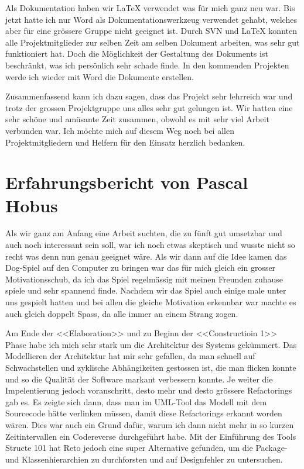 \documentclass[12pt,halfparskip]{scrartcl}
\begin{document}
Als Dokumentation haben wir LaTeX verwendet was für mich ganz neu war. Bis jetzt hatte ich nur Word als Dokumentationswerkzeug verwendet gehabt, welches aber für eine grössere Gruppe nicht geeignet ist. Durch SVN und LaTeX konnten alle Projektmitglieder zur selben Zeit am selben Dokument arbeiten, was sehr gut funktioniert hat. Doch die Möglichkeit der Gestaltung des Dokuments ist beschränkt, was ich persönlich sehr schade finde. In den kommenden Projekten werde ich wieder mit Word die Dokumente erstellen.

Zusammenfassend kann ich dazu sagen, dass das Projekt sehr lehrreich war und trotz der grossen Projektgruppe uns alles sehr gut gelungen ist. Wir hatten eine sehr schöne und amüsante Zeit zusammen, obwohl es mit sehr viel Arbeit verbunden war. Ich möchte mich auf diesem Weg noch bei allen Projektmitgliedern und Helfern für den Einsatz herzlich bedanken.


\section{Erfahrungsbericht von Pascal Hobus}

Als wir ganz am Anfang eine Arbeit suchten, die zu fünft gut umsetzbar und auch noch interessant sein soll, war ich noch etwas skeptisch und wusste nicht so recht was denn nun genau geeignet wäre. Als wir dann auf die Idee kamen das Dog-Spiel auf den Computer zu bringen war das für mich gleich ein grosser Motivationsschub, da ich das Spiel regelmässig mit meinen Freunden zuhause spiele und sehr spannend finde. Nachdem wir das Spiel auch einige male unter uns gespielt hatten und bei allen die gleiche Motivation erkennbar war machte es auch gleich doppelt Spass, da alle immer an einem Strang zogen.

Am Ende der <<Elaboration>> und zu Beginn der <<Constructioin 1>> Phase habe ich mich sehr stark um die Architektur des Systems gekümmert. Das Modellieren der Architektur hat mir sehr gefallen, da man schnell auf Schwachstellen und zyklische Abhängikeiten gestossen ist, die man flicken konnte und so die Qualität der Software markant verbessern konnte. Je weiter die Impelentierung jedoch voranschritt, desto mehr und desto grössere Refactorings gab es. Es zeigte sich dann, dass man im UML-Tool das Modell mit dem Sourcecode hätte verlinken müssen, damit diese Refactorings erkannt worden wären. Dies war auch ein Grund dafür, warum ich dann nicht mehr in so kurzen Zeitintervallen ein Codereverse durchgeführt habe. Mit der Einführung des Tools Structe 101 hat Reto jedoch eine super Alternative gefunden, um die Package- und Klassenhierarchien zu durchforsten und auf Designfehler zu untersuchen.
\end{document}
